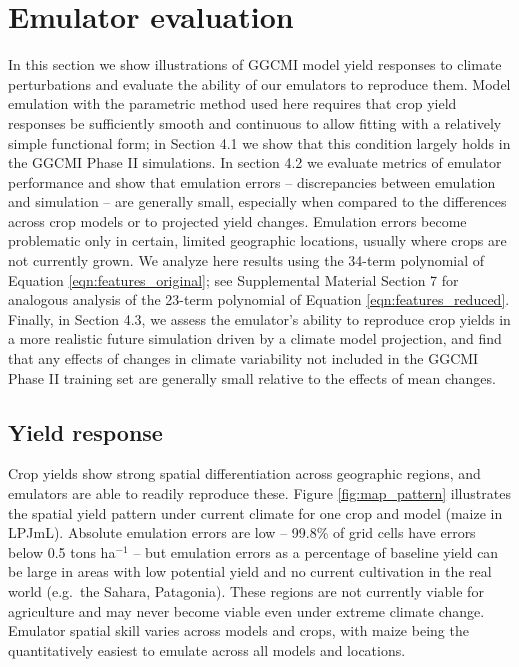 \documentclass[gmdd]{copernicus} %
\begin{document}
\section{Emulator evaluation}
\label{S:4}
In this section we show illustrations of GGCMI model yield responses to climate perturbations  and evaluate the ability of our emulators to reproduce them.   
Model emulation with the parametric method used here requires that crop yield responses be sufficiently smooth and continuous to allow fitting with a relatively simple functional form; in Section 4.1 we show that this condition largely holds in the GGCMI Phase II simulations. 
In section 4.2 we evaluate metrics of emulator performance and show that emulation errors -- discrepancies between emulation and simulation -- are generally small, especially when compared to the differences across crop models or to projected yield changes. 
Emulation errors become problematic only in certain, limited geographic locations, usually where crops are not currently grown. 
We analyze here results using the 34-term polynomial of Equation \ref{eqn:features_original}; see Supplemental Material Section 7 for analogous analysis of the 23-term polynomial of Equation \ref{eqn:features_reduced}.
Finally, in Section 4.3, we assess the emulator's ability to reproduce crop yields in a more realistic future simulation driven by a climate model projection, and find that any effects of changes in climate variability not included in the GGCMI Phase II training set are generally small relative to the effects of mean changes.

\subsection{Yield response}
\label{S:4.1}
Crop yields show strong spatial differentiation across geographic regions, and emulators are able to readily reproduce these. Figure \ref{fig:map_pattern} illustrates the spatial yield pattern under current climate for one crop and model (maize in LPJmL). Absolute emulation errors are low --  99.8\% of grid cells have errors below 0.5 tons ha$^{-1}$ -- but 
emulation errors as a percentage of baseline yield can be large in areas with low potential yield and no current cultivation in the real world (e.g.\ the Sahara, Patagonia).
These regions are not currently viable for agriculture and may never become viable even under extreme climate change.  
Emulator spatial skill varies across models and crops, with maize being the quantitatively easiest to emulate across all models and locations.
\end{document}
